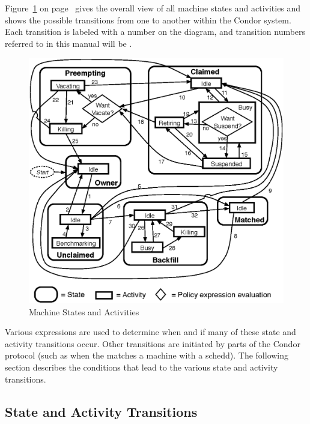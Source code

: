 Figure~\ref{fig:machine-activities} on
page~\pageref{fig:machine-activities} gives the overall view of all
machine states and activities and shows the possible transitions
from one to another within the Condor system.  
Each transition is labeled with a number on the diagram, and
transition numbers referred to in this manual will be .  

\begin{figure}[hbt]
\centering
\includegraphics{admin-man/machine-activities.eps}
\caption{\label{fig:machine-activities}Machine States and Activities}
\end{figure}

Various expressions are used to determine when and if many of these
state and activity transitions occur.  Other transitions are initiated
by parts of the Condor protocol (such as when the 
matches a machine with a schedd).  The following section describes the
conditions that lead to the various state and activity transitions.

\subsection{\label{sec:State-and-Activity-Transitions}
State and Activity Transitions}

